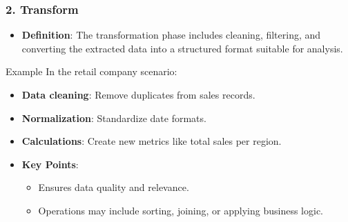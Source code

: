 \documentclass[aspectratio=169]{beamer}
\begin{document}
\begin{frame}[fragile]
    \frametitle{2. Transform}
    \begin{itemize}
        \item \textbf{Definition}: The transformation phase includes cleaning, filtering, and converting the extracted data into a structured format suitable for analysis.
    \end{itemize}

    \begin{block}{Example}
        In the retail company scenario:
        \begin{itemize}
            \item \textbf{Data cleaning}: Remove duplicates from sales records.
            \item \textbf{Normalization}: Standardize date formats.
            \item \textbf{Calculations}: Create new metrics like total sales per region.
        \end{itemize}
    \end{block}

    \begin{itemize}
        \item \textbf{Key Points}:
        \begin{itemize}
            \item Ensures data quality and relevance.
            \item Operations may include sorting, joining, or applying business logic.
        \end{itemize}
    \end{itemize}
\end{frame}
\end{document}
